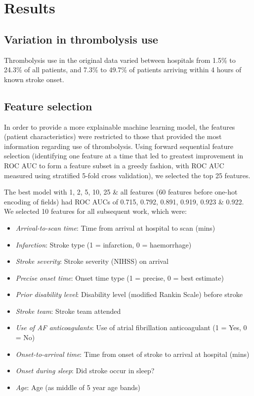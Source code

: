\section{Results}

\subsection{Variation in thrombolysis use}

Thrombolysis use in the original data varied between hospitals from 1.5\% to 24.3\% of all patients, and 7.3\% to 49.7\% of patients arriving within 4 hours of known stroke onset.


\subsection{Feature selection}
In order to provide a more explainable machine learning model, the features (patient characteristics) were restricted to those that provided the most information regarding use of thrombolysis. Using forward sequential feature selection (identifying one feature at a time that led to greatest improvement in ROC AUC to form a feature subset in a greedy fashion, with ROC AUC measured using stratified 5-fold cross validation), we selected the top 25 features.

The best model with 1, 2, 5, 10, 25 \& all features (60 features before one-hot encoding of fields) had ROC AUCs of 0.715, 0.792, 0.891, 0.919, 0.923 \& 0.922. We selected 10 features for all subsequent work, which were:

\begin{itemize}
    \item \emph{Arrival-to-scan time}: Time from arrival at hospital to scan (mins)
    \item \emph{Infarction}: Stroke type (1 = infarction, 0 = haemorrhage)
    \item \emph{Stroke severity}: Stroke severity (NIHSS) on arrival
    \item \emph{Precise onset time}: Onset time type (1 = precise, 0 = best estimate)
    \item \emph{Prior disability level}: Disability level (modified Rankin Scale) before stroke
    \item \emph{Stroke team}: Stroke team attended
    \item \emph{Use of AF anticoagulants}: Use of atrial fibrillation anticoagulant (1 = Yes, 0 = No)
    \item \emph{Onset-to-arrival time}: Time from onset of stroke to arrival at hospital (mins)
    \item \emph{Onset during sleep}: Did stroke occur in sleep?
    \item \emph{Age}: Age (as middle of 5 year age bands)
\end{itemize}


